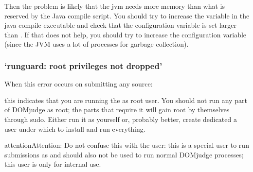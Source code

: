 \documentclass[a4paper,10pt,english,openany]{sphinxmanual}
\begin{document}
\begin{sphinxVerbatim}[commandchars=\\\{\}]
     
       
\end{sphinxVerbatim}

\sphinxAtStartPar
Then the problem is likely that the jvm needs more memory than what is
reserved by the Java compile script. You should try to increase the
 variable in the java compile executable and check that
the configuration variable  is set larger than
. If that does not help, you should try to increase the
configuration variable  (since the JVM uses a lot of
processes for garbage collection).


\subsubsection{‘runguard: root privileges not dropped’}
\label{\detokenize{judging:runguard-root-privileges-not-dropped}}
\sphinxAtStartPar
When this error occurs on submitting any source:

\begin{sphinxVerbatim}[commandchars=\\\{\}]
      
    
\end{sphinxVerbatim}

\sphinxAtStartPar
this indicates that you are running the  as root user. You should
not run any part of DOMjudge as root; the parts that require it will gain root
by themselves through sudo. Either run it as yourself or, probably better,
create dedicated a user  under which to install and run everything.

\begin{sphinxadmonition}{attention}{Attention:}
\sphinxAtStartPar
Do not confuse this with the  user:
this is a special user to run submissions as and should also not
be used to run normal DOMjudge processes; this user is only for
internal use.
\end{sphinxadmonition}
\end{document}
